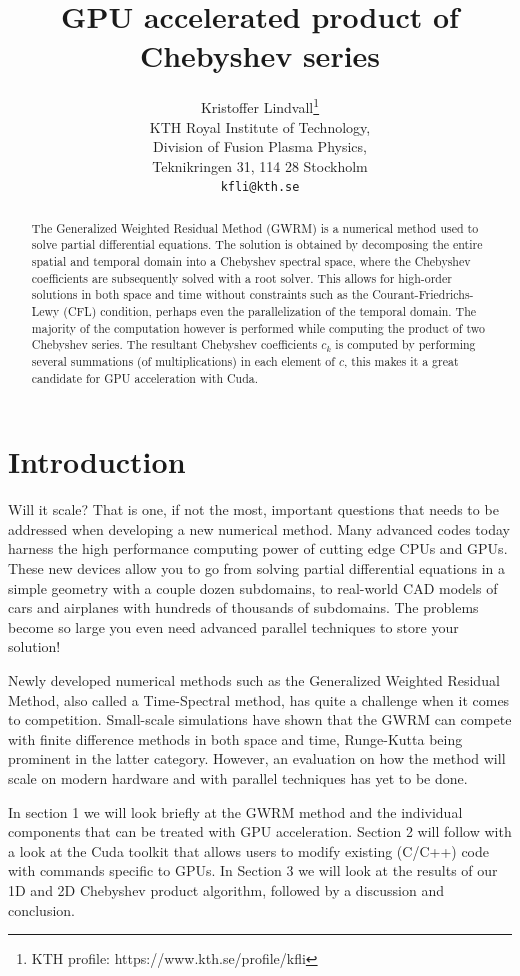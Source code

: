 \documentclass{article}
\title{GPU accelerated product of Chebyshev series}
\author{
  Kristoffer Lindvall\thanks{KTH profile: https://www.kth.se/profile/kfli} \\
  KTH Royal Institute of Technology, \\
  Division of Fusion Plasma Physics, \\
  Teknikringen 31, 114 28 Stockholm \\
  \texttt{kfli@kth.se} \\
}
\begin{document}
\maketitle

\begin{abstract}
The Generalized Weighted Residual Method (GWRM) is a numerical method used to solve partial differential equations. The solution is obtained by decomposing the entire spatial and temporal domain into a Chebyshev spectral space, where the Chebyshev coefficients are subsequently solved with a root solver. This allows for high-order solutions in both space and time without constraints such as the Courant-Friedrichs-Lewy (CFL) condition, perhaps even the parallelization of the temporal domain. The majority of the computation however is performed while computing the product of two Chebyshev series. The resultant Chebyshev coefficients $c_k$ is computed by performing several summations (of multiplications) in each element of $c$, this makes it a great candidate for GPU acceleration with Cuda. 
\end{abstract}




\section{Introduction}
Will it scale? That is one, if not the most, important questions that needs to be addressed when developing a new numerical method. Many advanced codes today harness the high performance computing power of cutting edge CPUs and GPUs. These new devices allow you to go from solving partial differential equations in a simple geometry with a couple dozen subdomains, to real-world CAD models of cars and airplanes with hundreds of thousands of subdomains. The problems become so large you even need advanced parallel techniques to store your solution!

Newly developed numerical methods such as the Generalized Weighted Residual Method, also called a Time-Spectral method, has quite a challenge when it comes to competition. Small-scale simulations have shown that the GWRM can compete with finite difference methods in both space and time, Runge-Kutta being prominent in the latter category. However, an evaluation on how the method will scale on modern hardware and with parallel techniques has yet to be done. 

In section 1 we will look briefly at the GWRM method and the individual components that can be treated with GPU acceleration. Section 2 will follow with a look at the Cuda toolkit that allows users to modify existing (C/C++) code with commands specific to GPUs. In Section 3 we will look at the results of our 1D and 2D Chebyshev product algorithm, followed by a discussion and conclusion.
\end{document}
